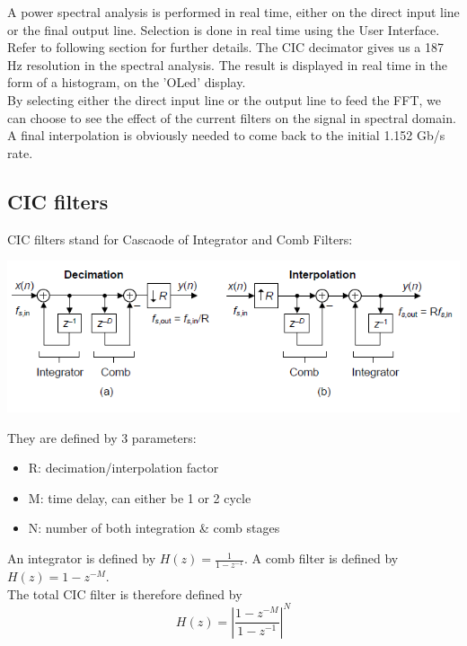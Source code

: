 \documentclass{article}
\begin{document}
A power spectral analysis is performed in real time,
either on the direct input line
or the final output line. Selection is done in
real time using the User Interface. Refer
to following section for further details.
The CIC decimator gives us a 187 Hz resolution in the spectral
analysis. The result is displayed in real time in the
form of a histogram, on the 'OLed' display. \\

By selecting either the direct input line
or the output line to feed the FFT, we
can choose to see the effect of the current filters
on the signal in spectral domain. \\

A final interpolation is obviously
needed to come back to the initial 1.152 Gb/s rate.

\newpage
\subsection{CIC filters}

CIC filters stand for Cascaode of Integrator and Comb Filters:
\begin{center}
	\includegraphics[width=0.75\linewidth]{CIC_digital_filters_fig6.png} \\
\end{center}

They are defined by 3 parameters:
\begin{itemize}
	\item R: decimation/interpolation factor
	\item M: time delay, can either be 1 or 2 cycle
	\item N: number of both integration \& comb stages
\end{itemize}

An integrator is defined by $H(z) = \frac{1}{1 - z^{-1}}$.
A comb filter is defined by $H(z) = 1 - z^{-M}$. \\

The total CIC filter is therefore defined by 
\begin{equation}
	H(z) = \left| \frac{1 - z^{-M}}{1 - z^{-1}} \right|^N
\end{equation}
\end{document}
